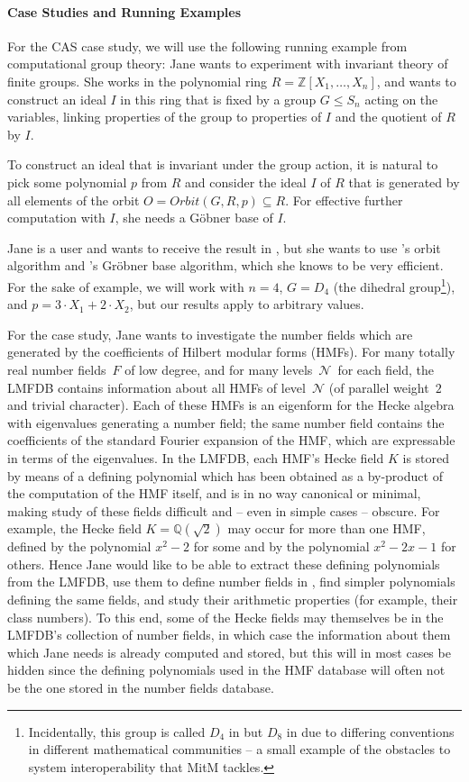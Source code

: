 \paragraph{Case Studies and Running Examples}
For the CAS case study, we will use the following running example from computational group theory: Jane wants to experiment with invariant theory of finite groups.
She works in the polynomial ring $R=\mathbb{Z}[X_1,\ldots,X_n]$, and wants to construct an ideal $I$ in this ring that is fixed by a group $G \leq S_n$ acting on the variables, linking properties of the group to properties of $I$ and the quotient of $R$ by $I$.

To construct an ideal that is invariant
under the group action, it is natural to pick some polynomial $p$ from $R$
and consider the ideal $I$ of $R$ that is generated by all elements of the orbit
$O=Orbit(G,R,p)\subseteq R$.
For effective further computation with $I$, she needs a G\"obner base of $I$.

Jane is a \Sage user and wants to receive the result in \Sage, but she wants to
use \GAP's orbit algorithm and \Singular's Gr\"obner base algorithm, which she
knows to be very efficient. For the sake of example, we will work with $n=4$,
$G=D_4$ (the dihedral group\footnote{Incidentally, this group is called $D_4$ in
\Sage but $D_8$ in \GAP due to differing conventions in different mathematical
communities -- a small example of the obstacles to system interoperability that
MitM tackles.}), and $p=3\cdot X_1+2\cdot X_2$, but our results apply to
arbitrary values.

\def\Q{{\mathbb Q}} \def\N{{\mathcal{N}}} For the \LMFDB case study, Jane wants to investigate the number fields which are generated by the coefficients of Hilbert modular forms (HMFs).  For many totally real number fields~$F$ of low degree, and for many levels~$\N$\ for each field, the LMFDB contains information about all HMFs of level~$\N$ (of parallel weight~$2$ and trivial character).  Each of these HMFs is an eigenform for the Hecke algebra with eigenvalues generating a number field; the same number field contains the coefficients of the standard Fourier expansion of the HMF, which are expressable in terms of the eigenvalues.  In the LMFDB, each HMF's Hecke field $K$ is stored by means of a defining polynomial which has been obtained as a by-product of the computation of the HMF itself, and is in no way canonical or minimal, making study of these fields difficult and -- even in simple cases -- obscure.  For example, the Hecke field $K=\Q(\sqrt{2})$ may occur for more than one HMF, defined by the polynomial $x^2-2$ for some and by the polynomial $x^2-2x-1$ for others.  Hence Jane would like to be able to extract these defining polynomials from the LMFDB, use them to define number fields in \Sage, find simpler polynomials defining the same fields, and study their arithmetic properties (for example, their class numbers).  To this end, some of the Hecke fields may themselves be in the LMFDB's collection of number fields, in which case the information about them which Jane needs is already computed and stored, but this will in most cases be hidden since the defining polynomials used in the HMF database will often not be the one stored in the number fields database.

